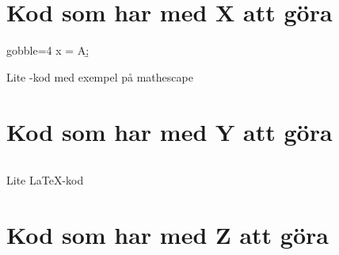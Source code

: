 \documentclass[../rapport_MVEX01-11-05]{subfiles}
\begin{document}

\section{Kod som har med X att göra}

\begin{listing}[H]
  \begin{matlabcode*}{gobble=4}
    x = A\b;
  \end{matlabcode*}
	\caption{Lite \MATLAB-kod med exempel på mathescape}
	\label{code:MATLAB-1}
\end{listing}

\section{Kod som har med Y att göra}

\begin{listing}[H]
	\inputminted[linenos,mathescape,bgcolor=codebg]{latex}{kapitel/kodappendix.tex}
	\caption{Lite \LaTeX-kod}
	\label{code:MATLAB-2}
\end{listing}
	\clearpage

\section{Kod som har med Z att göra}
\end{document}
